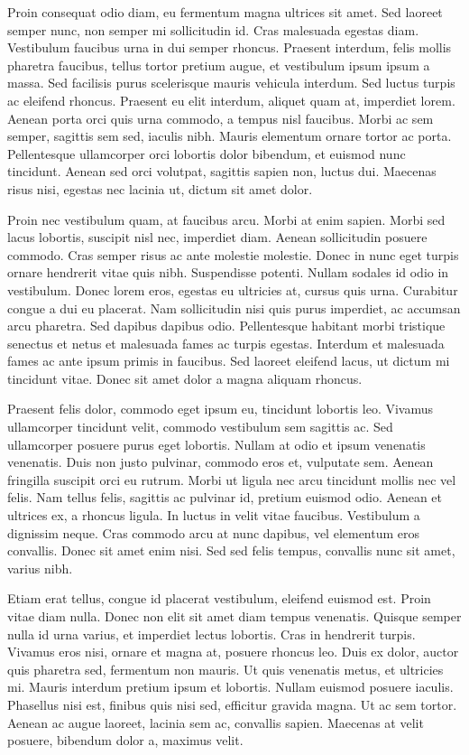 \documentclass[12pt, letterpaper,twocolumn]{article}
\begin{document}
Proin consequat odio diam, eu fermentum magna ultrices sit amet. Sed laoreet semper nunc, non semper mi sollicitudin id. Cras malesuada egestas diam. Vestibulum faucibus urna in dui semper rhoncus. Praesent interdum, felis mollis pharetra faucibus, tellus tortor pretium augue, et vestibulum ipsum ipsum a massa. Sed facilisis purus scelerisque mauris vehicula interdum. Sed luctus turpis ac eleifend rhoncus. Praesent eu elit interdum, aliquet quam at, imperdiet lorem. Aenean porta orci quis urna commodo, a tempus nisl faucibus. Morbi ac sem semper, sagittis sem sed, iaculis nibh. Mauris elementum ornare tortor ac porta. Pellentesque ullamcorper orci lobortis dolor bibendum, et euismod nunc tincidunt. Aenean sed orci volutpat, sagittis sapien non, luctus dui. Maecenas risus nisi, egestas nec lacinia ut, dictum sit amet dolor.

Proin nec vestibulum quam, at faucibus arcu. Morbi at enim sapien. Morbi sed lacus lobortis, suscipit nisl nec, imperdiet diam. Aenean sollicitudin posuere commodo. Cras semper risus ac ante molestie molestie. Donec in nunc eget turpis ornare hendrerit vitae quis nibh. Suspendisse potenti. Nullam sodales id odio in vestibulum. Donec lorem eros, egestas eu ultricies at, cursus quis urna. Curabitur congue a dui eu placerat. Nam sollicitudin nisi quis purus imperdiet, ac accumsan arcu pharetra. Sed dapibus dapibus odio. Pellentesque habitant morbi tristique senectus et netus et malesuada fames ac turpis egestas. Interdum et malesuada fames ac ante ipsum primis in faucibus. Sed laoreet eleifend lacus, ut dictum mi tincidunt vitae. Donec sit amet dolor a magna aliquam rhoncus.

Praesent felis dolor, commodo eget ipsum eu, tincidunt lobortis leo. Vivamus ullamcorper tincidunt velit, commodo vestibulum sem sagittis ac. Sed ullamcorper posuere purus eget lobortis. Nullam at odio et ipsum venenatis venenatis. Duis non justo pulvinar, commodo eros et, vulputate sem. Aenean fringilla suscipit orci eu rutrum. Morbi ut ligula nec arcu tincidunt mollis nec vel felis. Nam tellus felis, sagittis ac pulvinar id, pretium euismod odio. Aenean et ultrices ex, a rhoncus ligula. In luctus in velit vitae faucibus. Vestibulum a dignissim neque. Cras commodo arcu at nunc dapibus, vel elementum eros convallis. Donec sit amet enim nisi. Sed sed felis tempus, convallis nunc sit amet, varius nibh.

Etiam erat tellus, congue id placerat vestibulum, eleifend euismod est. Proin vitae diam nulla. Donec non elit sit amet diam tempus venenatis. Quisque semper nulla id urna varius, et imperdiet lectus lobortis. Cras in hendrerit turpis. Vivamus eros nisi, ornare et magna at, posuere rhoncus leo. Duis ex dolor, auctor quis pharetra sed, fermentum non mauris. Ut quis venenatis metus, et ultricies mi. Mauris interdum pretium ipsum et lobortis. Nullam euismod posuere iaculis. Phasellus nisi est, finibus quis nisi sed, efficitur gravida magna. Ut ac sem tortor. Aenean ac augue laoreet, lacinia sem ac, convallis sapien. Maecenas at velit posuere, bibendum dolor a, maximus velit.
\end{document}
